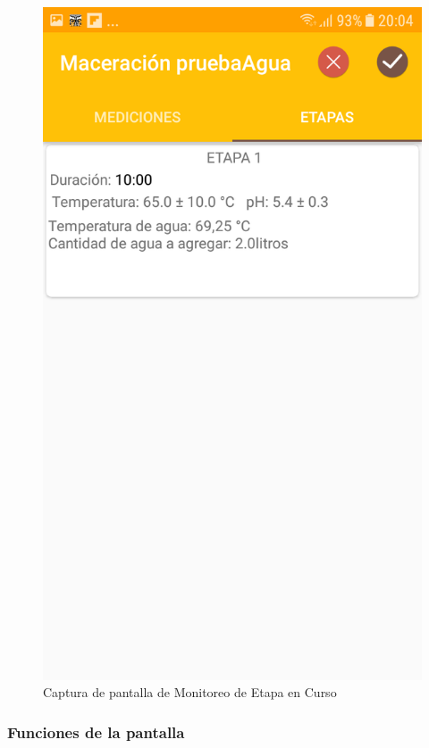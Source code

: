             \begin{figure}[h]
                \centering
                \includegraphics[scale=0.2]{software/ScreenCapture/StageFragment.jpg}
                \caption{Captura de pantalla de Monitoreo de Etapa en Curso}
                \label{fig:CapturaStageFrag}
            \end{figure}
            
            \subsubsection{Funciones de la pantalla}
            
